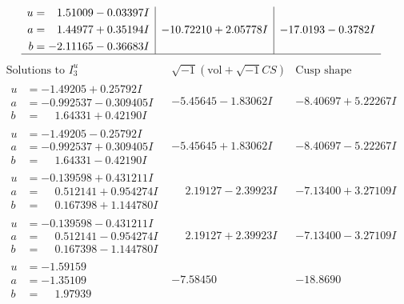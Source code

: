 \documentclass[1p]{elsarticle_modified}
\theoremstyle{definition}
\newcommand{\I}{\sqrt{-1}}
\begin{document}
$$\begin{array}{c|c|c}
\begin{aligned}
u &= \phantom{-}1.51009 - 0.03397 I \\
a &= \phantom{-}1.44977 + 0.35194 I \\
b &= -2.11165 - 0.36683 I\end{aligned}
 & -10.72210 + 2.05778 I & -17.0193 - 0.3782 I\\
 \hline 
 \end{array}$$\newpage$$\begin{array}{c|c|c}  
\text{Solutions to }I^u_{3}& \I (\text{vol} + \sqrt{-1}CS) & \text{Cusp shape}\\
 \hline 
\begin{aligned}
u &= -1.49205 + 0.25792 I \\
a &= -0.992537 - 0.309405 I \\
b &= \phantom{-}1.64331 + 0.42190 I\end{aligned}
 & -5.45645 - 1.83062 I & -8.40697 + 5.22267 I \\ \hline\begin{aligned}
u &= -1.49205 - 0.25792 I \\
a &= -0.992537 + 0.309405 I \\
b &= \phantom{-}1.64331 - 0.42190 I\end{aligned}
 & -5.45645 + 1.83062 I & -8.40697 - 5.22267 I \\ \hline\begin{aligned}
u &= -0.139598 + 0.431211 I \\
a &= \phantom{-}0.512141 + 0.954274 I \\
b &= \phantom{-}0.167398 + 1.144780 I\end{aligned}
 & \phantom{-}2.19127 - 2.39923 I & -7.13400 + 3.27109 I \\ \hline\begin{aligned}
u &= -0.139598 - 0.431211 I \\
a &= \phantom{-}0.512141 - 0.954274 I \\
b &= \phantom{-}0.167398 - 1.144780 I\end{aligned}
 & \phantom{-}2.19127 + 2.39923 I & -7.13400 - 3.27109 I \\ \hline\begin{aligned}
u &= -1.59159\phantom{ +0.000000I} \\
a &= -1.35109\phantom{ +0.000000I} \\
b &= \phantom{-}1.97939\phantom{ +0.000000I}\end{aligned}
 & -7.58450\phantom{ +0.000000I} & -18.8690\phantom{ +0.000000I} \\ \hline\begin{aligned}

\end{aligned}
\end{array}$$
\end{document}
